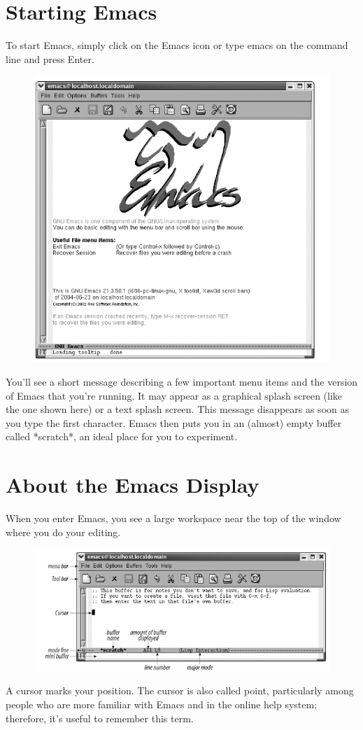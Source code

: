 \documentclass[12pt]{book}
\begin{document}
\section{Starting Emacs}
To start Emacs, simply click on the Emacs icon or type emacs on the command line and press Enter.
\begin{figure}[H]\centering\includegraphics[scale=0.6]{image//Emacs//1}\end{figure}
You’ll see a short message describing a few important menu items and the version of Emacs that you’re running. It may appear as a graphical splash screen (like the one shown here) or a text splash screen. This message disappears as soon as you type the first character. Emacs then puts you in an (almost) empty buffer called *scratch*, an ideal place for you to experiment. 
\section{About the Emacs Display}
When you enter Emacs, you see a large workspace near the top of the window where you do your editing. 
\begin{figure}[H]\centering\includegraphics[scale=0.7]{image//Emacs//2}\end{figure}
A cursor marks your position. The cursor is also called point, particularly among people who are more familiar with Emacs and in the online help system; therefore, it's useful to remember this term.
\end{document}
